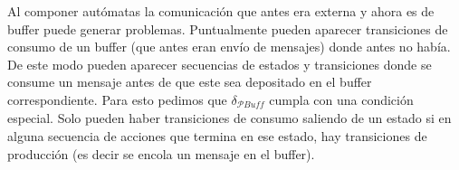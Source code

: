 Al componer autómatas la comunicación que antes era externa y ahora es de buffer puede generar problemas. Puntualmente pueden aparecer transiciones de consumo de un buffer (que antes eran envío de mensajes) donde antes no había. De este modo pueden aparecer secuencias de estados y transiciones donde se consume un mensaje antes de que este sea depositado en el buffer correspondiente. Para esto pedimos que $\delta_\mathit{\mathcal{P}Buff}$ cumpla con una condición especial. Solo pueden haber transiciones de consumo saliendo de un estado si en alguna secuencia de acciones que termina en ese estado, hay transiciones de producción (es decir se encola un mensaje en el buffer).

\begin{ejemplo}
\label{ex:Composicion}
%

\end{ejemplo}
